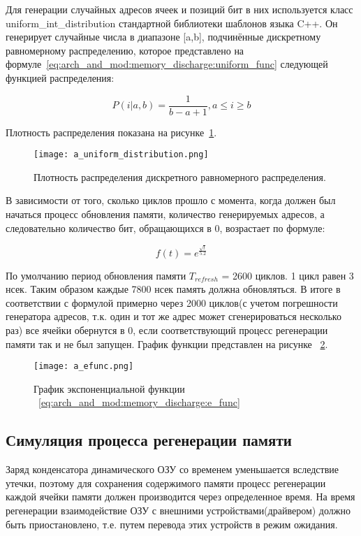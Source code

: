 Для генерации случайных адресов ячеек и позиций бит в них используется класс uniform\_int\_distribution стандартной библиотеки шаблонов языка C++. 
Он генерирует случайные числа в диапазоне [a,b], подчинённые дискретному равномерному распределению, которое представлено на формуле~\ref{eq:arch_and_mod:memory_discharge:uniform_func} следующей функцией распределения:

\begin{equation}
  \label{eq:arch_and_mod:memory_discharge:uniform_func}
  P(i|a,b) = \frac{1}
           {b-a+1}, a \le i \ge b
\end{equation}

Плотность распределения показана на рисунке~\ref{fig:arch_and_mod:modules:uniform_distribution}.

\begin{figure}[ht]
\centering
  \texttt{[image: a\_uniform\_distribution.png]}  
  \caption{ Плотность распределения дискретного равномерного распределения. }
  \label{fig:arch_and_mod:modules:uniform_distribution}
\end{figure}

В зависимости от того, сколько циклов прошло с момента, когда должен был начаться процесс обновления памяти, количество генерируемых адресов, а следовательно количество бит, обращающихся в 0, возрастает по формуле:

\begin{equation}
  \label{eq:arch_and_mod:memory_discharge:e_func}
  f(t) = e^{\frac{\sqrt{t}}
           {5.2}}
\end{equation}

По умолчанию период обновления памяти $T_{refresh}$ = 2600 циклов. 1 цикл равен 3 нсек. Таким образом каждые 7800 нсек память должна обновляться. В итоге в соответствии с формулой примерно через 2000 циклов(с учетом погрешности генератора адресов, т.к. один и тот же адрес может сгенерироваться несколько раз) все ячейки обернутся в 0, если соответствующий процесс регенерации памяти так и не был запущен. График функции представлен на рисунке ~\ref{fig:arch_and_mod:memory_discharge:efunc_grafic}.

\begin{figure}[ht]
\centering
  \texttt{[image: a\_efunc.png]}  
  \caption{ График экспоненциальной функции ~\ref{eq:arch_and_mod:memory_discharge:e_func} }
  \label{fig:arch_and_mod:memory_discharge:efunc_grafic}
\end{figure}

\subsection{Симуляция процесса регенерации памяти}
\label{sub:arch_and_mod:memory_refresh}
Заряд конденсатора динамического ОЗУ со временем уменьшается вследствие утечки, поэтому для сохранения содержимого памяти процесс регенерации каждой ячейки памяти должен производится через определенное время. На время регенерации взаимодействие ОЗУ с внешними устройствами(драйвером) должно быть приостановлено, т.е. путем перевода этих устройств в режим ожидания.

